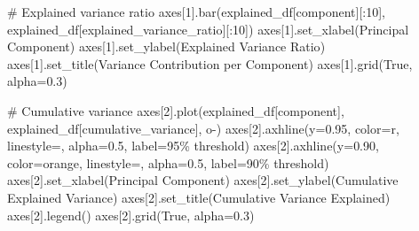 \documentclass[
  letterpaper,
  DIV=11,
  numbers=noendperiod]{scrartcl}
\newenvironment{Shaded}{\begin{snugshade}}{\end{snugshade}}
\newcommand{\CommentTok}[1]{\textcolor[rgb]{0.37,0.37,0.37}{#1}}
\newcommand{\DecValTok}[1]{\textcolor[rgb]{0.68,0.00,0.00}{#1}}
\newcommand{\FloatTok}[1]{\textcolor[rgb]{0.68,0.00,0.00}{#1}}
\newcommand{\NormalTok}[1]{\textcolor[rgb]{0.00,0.23,0.31}{#1}}
\newcommand{\OperatorTok}[1]{\textcolor[rgb]{0.37,0.37,0.37}{#1}}
\newcommand{\StringTok}[1]{\textcolor[rgb]{0.13,0.47,0.30}{#1}}
\newcommand{\VariableTok}[1]{\textcolor[rgb]{0.07,0.07,0.07}{#1}}
\renewenvironment{Shaded}{%
  \begin{tcolorbox}[%
    enhanced,%
    colback=codebg,%
    colframe=codebg,%
    borderline west={3pt}{0pt}{sectionblue},%
    fontupper=\small\ttfamily,%
    boxrule=0pt,%
    arc=0pt,%
    boxsep=5pt,%
    left=2mm,%
    right=2mm,%
    top=2mm,%
    bottom=2mm%
  ]%
}{%
  \end{tcolorbox}%
}
\begin{document}
\begin{Shaded}
\begin{Highlighting}[]
\CommentTok{\# Explained variance ratio}
\NormalTok{axes[}\DecValTok{1}\NormalTok{].bar(explained\_df[}\StringTok{\textquotesingle{}component\textquotesingle{}}\NormalTok{][:}\DecValTok{10}\NormalTok{], explained\_df[}\StringTok{\textquotesingle{}explained\_variance\_ratio\textquotesingle{}}\NormalTok{][:}\DecValTok{10}\NormalTok{])}
\NormalTok{axes[}\DecValTok{1}\NormalTok{].set\_xlabel(}\StringTok{\textquotesingle{}Principal Component\textquotesingle{}}\NormalTok{)}
\NormalTok{axes[}\DecValTok{1}\NormalTok{].set\_ylabel(}\StringTok{\textquotesingle{}Explained Variance Ratio\textquotesingle{}}\NormalTok{)}
\NormalTok{axes[}\DecValTok{1}\NormalTok{].set\_title(}\StringTok{\textquotesingle{}Variance Contribution per Component\textquotesingle{}}\NormalTok{)}
\NormalTok{axes[}\DecValTok{1}\NormalTok{].grid(}\VariableTok{True}\NormalTok{, alpha}\OperatorTok{=}\FloatTok{0.3}\NormalTok{)}

\CommentTok{\# Cumulative variance}
\NormalTok{axes[}\DecValTok{2}\NormalTok{].plot(explained\_df[}\StringTok{\textquotesingle{}component\textquotesingle{}}\NormalTok{], explained\_df[}\StringTok{\textquotesingle{}cumulative\_variance\textquotesingle{}}\NormalTok{], }\StringTok{\textquotesingle{}o{-}\textquotesingle{}}\NormalTok{)}
\NormalTok{axes[}\DecValTok{2}\NormalTok{].axhline(y}\OperatorTok{=}\FloatTok{0.95}\NormalTok{, color}\OperatorTok{=}\StringTok{\textquotesingle{}r\textquotesingle{}}\NormalTok{, linestyle}\OperatorTok{=}\StringTok{\textquotesingle{}{-}{-}\textquotesingle{}}\NormalTok{, alpha}\OperatorTok{=}\FloatTok{0.5}\NormalTok{, label}\OperatorTok{=}\StringTok{\textquotesingle{}95\% threshold\textquotesingle{}}\NormalTok{)}
\NormalTok{axes[}\DecValTok{2}\NormalTok{].axhline(y}\OperatorTok{=}\FloatTok{0.90}\NormalTok{, color}\OperatorTok{=}\StringTok{\textquotesingle{}orange\textquotesingle{}}\NormalTok{, linestyle}\OperatorTok{=}\StringTok{\textquotesingle{}{-}{-}\textquotesingle{}}\NormalTok{, alpha}\OperatorTok{=}\FloatTok{0.5}\NormalTok{, label}\OperatorTok{=}\StringTok{\textquotesingle{}90\% threshold\textquotesingle{}}\NormalTok{)}
\NormalTok{axes[}\DecValTok{2}\NormalTok{].set\_xlabel(}\StringTok{\textquotesingle{}Principal Component\textquotesingle{}}\NormalTok{)}
\NormalTok{axes[}\DecValTok{2}\NormalTok{].set\_ylabel(}\StringTok{\textquotesingle{}Cumulative Explained Variance\textquotesingle{}}\NormalTok{)}
\NormalTok{axes[}\DecValTok{2}\NormalTok{].set\_title(}\StringTok{\textquotesingle{}Cumulative Variance Explained\textquotesingle{}}\NormalTok{)}
\NormalTok{axes[}\DecValTok{2}\NormalTok{].legend()}
\NormalTok{axes[}\DecValTok{2}\NormalTok{].grid(}\VariableTok{True}\NormalTok{, alpha}\OperatorTok{=}\FloatTok{0.3}\NormalTok{)}


\end{Highlighting}
\end{Shaded}
\end{document}
